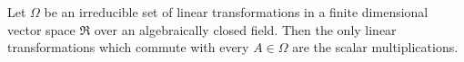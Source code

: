 Let $\Omega$ be an irreducible set of linear transformations in a finite dimensional vector space $\mathfrak{R}$ over an algebraically closed field. Then the only linear transformations which commute with every $A \in \Omega$ are the scalar multiplications.
